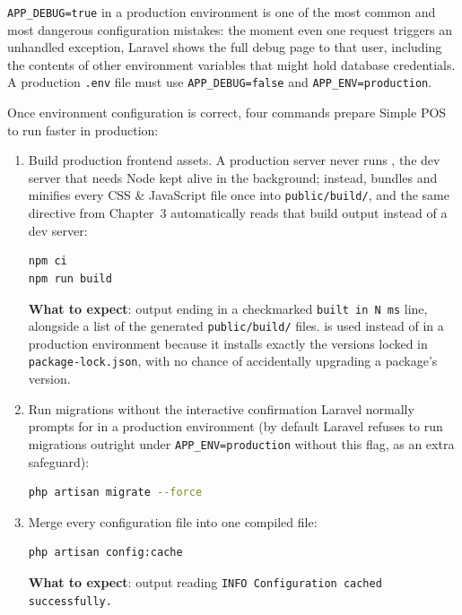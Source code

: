 \begin{warningbox}
\texttt{APP\_DEBUG=true} in a production environment is one of the most
common and most dangerous configuration mistakes: the moment even one
request triggers an unhandled exception, Laravel shows the full debug
page to that user, including the contents of other environment
variables that might hold database credentials. A production
\texttt{.env} file must use \texttt{APP\_DEBUG=false} and
\texttt{APP\_ENV=production}.
\end{warningbox}

Once environment configuration is correct, four commands prepare
Simple POS to run faster in production:

\begin{enumerate}
  \item Build production frontend assets. A production server never runs
    , the dev server that needs Node kept alive in the
    background; instead,  bundles and minifies every
    CSS \& JavaScript file once into \texttt{public/build/}, and the same
     directive from Chapter~3 automatically reads that build
    output instead of a dev server:
    \begin{lstlisting}[language=bash]
npm ci
npm run build
    \end{lstlisting}
    \textbf{What to expect}: output ending in a checkmarked
    \texttt{built in N ms} line, alongside a list of the generated
    \texttt{public/build/} files.  is used instead of
     in a production environment because it installs
    exactly the versions locked in \texttt{package-lock.json}, with no
    chance of accidentally upgrading a package's version.
  \item Run migrations without the interactive confirmation Laravel
    normally prompts for in a production environment (by default
    Laravel refuses to run migrations outright under
    \texttt{APP\_ENV=production} without this flag, as an extra
    safeguard):
    \begin{lstlisting}[language=bash]
php artisan migrate --force
    \end{lstlisting}
  \item Merge every configuration file into one compiled file:
    \begin{lstlisting}[language=bash]
php artisan config:cache
    \end{lstlisting}
    \textbf{What to expect}: output reading
    \texttt{INFO Configuration cached successfully.}

\end{enumerate}

